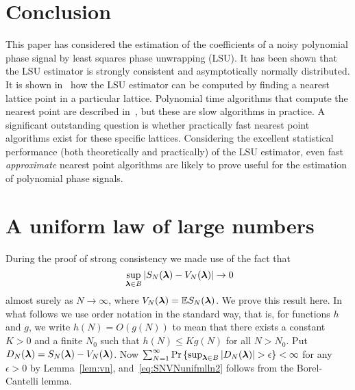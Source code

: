 \documentclass[aap]{imsart}
\newcommand{\prob}{\operatorname{Pr}}
\newcommand{\expect}{{\mathbb E}}
\newcommand{\abs}[1]{\left\vert #1 \right\vert}
\newcommand{\sabs}[1]{\vert #1 \vert}
\begin{document}
\section{Conclusion} \label{sec:conclusion}
 
This paper has considered the estimation of the coefficients of a noisy polynomial phase signal by least squares phase unwrapping (LSU). It has been shown that the LSU estimator is strongly consistent and asymptotically normally distributed. %
It is shown in~\cite[Sec~8.1]{McKilliam2010thesis}\cite{McKilliam2009asilomar_polyest_lattice} how the LSU estimator can be computed by finding a nearest lattice point in a particular lattice.  Polynomial time algorithms that compute the nearest point are described in~\cite[Sec.~4.3]{McKilliam2010thesis}, but these are slow algorithms in practice.  A significant outstanding question is whether practically fast nearest point algorithms exist for these specific lattices.  Considering the excellent statistical performance (both theoretically and practically) of the LSU estimator, even fast \emph{approximate} nearest point algorithms are likely to prove useful for the estimation of polynomial phase signals. 
  
\appendix



\section{A uniform law of large numbers} \label{app:uniform-law-large}

During the proof of strong consistency we made use of the fact that
\begin{equation}~\label{eq:SNVNunifmlln2}
\sup_{\lambdabf \in B}\sabs{S_N(\lambdabf) - V_N(\lambdabf)} \rightarrow 0
\end{equation}
almost surely as $N\rightarrow\infty$, where $V_N(\lambdabf) = \expect S_N(\lambdabf)$.  We prove this result here.  In what follows we use order notation in the standard way, that is, for functions $h$ and $g$, we write $h(N) = O(g(N))$ to mean that there exists a constant $K > 0$ and a finite $N_0$ such that $h(N) \leq K g(N)$ for all $N > N_0$. Put $D_N(\boldsymbol{\lambda}) = S_N(\boldsymbol{\lambda}) - V_N(\boldsymbol{\lambda})$.  Now $\sum_{N=1}^\infty \prob \left\{ \sup_{\lambdabf \in B}\abs{ D_N(\lambdabf) } > \epsilon \right\} < \infty$ for any $\epsilon > 0$ by Lemma~\ref{lem:vn}, and~\eqref{eq:SNVNunifmlln2} follows from the Borel-Cantelli lemma. 
\end{document}

